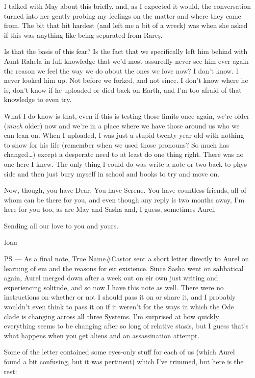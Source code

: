 I talked with May about this briefly, and, as I expected it would, the conversation turned into her gently probing my feelings on the matter and where they came from. The bit that hit hardest (and left me a bit of a wreck) was when she asked if this was anything like being separated from Rareș.

Is that the basis of this fear? Is the fact that we specifically left him behind with Aunt Rahela in full knowledge that we'd most assuredly never see him ever again the reason we feel the way we do about the ones we love now? I don't know. I never looked him up. Not before we forked, and not since. I don't know where he is, don't know if he uploaded or died back on Earth, and I'm too afraid of that knowledge to even try.

What I do know is that, even if this is testing those limits once again, we're older (\emph{much} older) now and we're in a place where we have those around us who we can lean on. When I uploaded, I was just a stupid twenty year old with nothing to show for his life (remember when we used those pronouns? So much has changed\ldots) except a desperate need to at least do one thing right. There was no one here I knew. The only thing I could do was write a note or two back to phys-side and then just bury myself in school and books to try and move on.

Now, though, you have Dear. You have Serene. You have countless friends, all of whom can be there for you, and even though any reply is two months away, I'm here for you too, as are May and Sasha and, I guess, sometimes Aurel.

Sending all our love to you and yours.

Ioan

PS — As a final note, True Name\#Castor sent a short letter directly to Aurel on learning of em and the reasons for eir existence. Since Sasha went on sabbatical again, Aurel merged down after a week out on eir own just writing and experiencing solitude, and so now I have this note as well. There were no instructions on whether or not I should pass it on or share it, and I probably wouldn't even think to pass it on if it weren't for the ways in which the Ode clade is changing across all three Systems. I'm surprised at how quickly everything seems to be changing after so long of relative stasis, but I guess that's what happens when you get aliens and an assassination attempt.

Some of the letter contained some eyes-only stuff for each of us (which Aurel found a bit confusing, but it was pertinent) which I've trimmed, but here is the rest:

